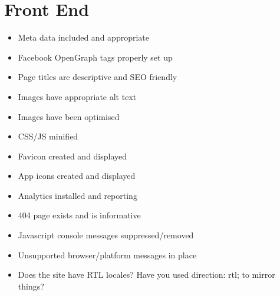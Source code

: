 \documentclass[letterpaper,10pt,english]{sphinxmanual}
\begin{document}
\section{Front End}
\label{prelaunch_checklist:front-end}\begin{itemize}
\item {} 
Meta data included and appropriate

\item {} 
Facebook OpenGraph tags properly set up

\item {} 
Page titles are descriptive and SEO friendly

\item {} 
Images have appropriate alt text

\item {} 
Images have been optimised

\item {} 
CSS/JS minified

\item {} 
Favicon created and displayed

\item {} 
App icons created and displayed

\item {} 
Analytics installed and reporting

\item {} 
404 page exists and is informative

\item {} 
Javascript console messages suppressed/removed

\item {} 
Unsupported browser/platform messages in place

\item {} 
Does the site have RTL locales? Have you used direction: rtl; to mirror things?

\end{itemize}
\end{document}
